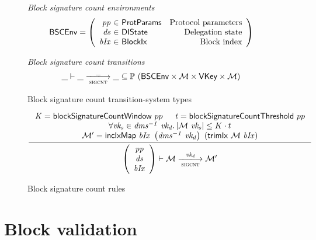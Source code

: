 \documentclass[11pt,a4paper]{article}
\newcommand{\powerset}[1]{\mathbb{P}~#1}
\newcommand{\var}[1]{\mathit{#1}}
\newcommand{\fun}[1]{\mathsf{#1}}
\newcommand{\type}[1]{\mathsf{#1}}
\newcommand{\size}[1]{\left| #1 \right|}
\newcommand{\trans}[2]{\xlongrightarrow[\textsc{#1}]{#2}}
\newcommand{\BlockIx}{\type{BlockIx}}
\newcommand{\VKey}{\type{VKey}}
\newcommand{\DelegState}{\type{DIState}}
\newcommand{\ProtParams}{\type{ProtParams}} %
\newcommand{\signmapname}{\mathcal{M}}
\newcommand{\trimixname}{trimIx}
\newcommand{\incixmapname}{incIxMap}
\newcommand{\signmap}[1]{\fun{\signmapname} ~ #1}
\newcommand{\trimix}[2]{\fun{\trimixname} ~ #1 ~ #2}
\newcommand{\incixmap}[3]{\fun{\incixmapname} ~ #1 ~ #2 ~ #3}
\begin{document}
\begin{figure}[ht]
  \emph{Block signature count environments}
  \begin{equation*}
    \BSCEnv =
    \left(
      \begin{array}{r@{~\in~}lr}
        \var{pp} & \ProtParams & \text{Protocol parameters} \\
        \var{ds} & \DelegState & \text{Delegation state} \\
        \var{bIx} & \BlockIx & \text{Block index}
      \end{array}
    \right)
  \end{equation*}

  \emph{Block signature count transitions}
  \begin{equation*}
    \_ \vdash \var{\_} \trans{sigcnt}{\_} \var{\_} \subseteq
    \powerset (\BSCEnv \times \signmapname \times \VKey \times \signmapname)
  \end{equation*}
  \caption{Block signature count transition-system types}
  \label{fig:ts-types:sigcnt}
\end{figure}

\begin{figure}[ht]
  \begin{equation*}
    \inference
    {
      \var{K} = \fun{blockSignatureCountWindow} ~ pp & \var{t} = \fun{blockSignatureCountThreshold} ~ pp \\
      \forall \var{vk_s} \in \var{dms^{-1}} ~ \var{vk_d} . \size{\signmap{\var{vk_s}}} \leq K \cdot t \\
      \signmapname' = \incixmap{\var{bIx}}{\left( \var{dms^{-1}} ~ \var{vk_d} \right)}{(\trimix{\signmapname}{\var{bIx}})}
    }
    {
      \left(
        {\begin{array}{c}
          \var{pp} \\
          \var{ds} \\
          \var{bIx}
        \end{array}}
      \right)
      \vdash
        {\signmapname}
      \trans{sigcnt}{\var{vk_d}}
        {\signmapname'}
    }
    \label{eq:rule:sigcnt}
  \end{equation*}
  \caption{Block signature count rules}
  \label{fig:rules:sigcnt}
\end{figure}

\clearpage

\section{Block validation}
\label{sec:block-validation}
\end{document}

